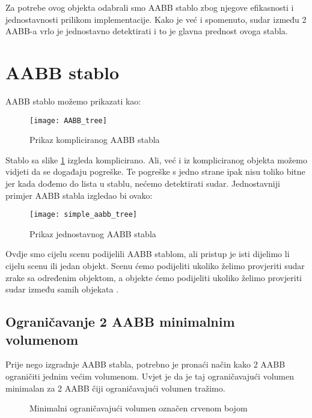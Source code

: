 Za potrebe ovog objekta odabrali smo AABB stablo zbog njegove efikasnosti i jednostavnosti prilikom implementacije. Kako je već i spomenuto, sudar između 2 AABB-a vrlo je jednostavno detektirati i to je glavna prednost ovoga stabla.

\section{AABB stablo}
AABB stablo možemo prikazati kao:
\begin{figure}[!http]
	\begin{center}
		\texttt{[image: AABB\_tree]}
		\caption{Prikaz kompliciranog AABB stabla \cite{5}}
		\label{fig:8}
	\end{center}
\end{figure}
Stablo sa slike \ref{fig:8} izgleda komplicirano. Ali, već i iz kompliciranog objekta možemo vidjeti da se događaju pogreške. Te pogreške s jedno strane ipak nisu toliko bitne jer kada dođemo do lista u stablu, nećemo detektirati sudar. Jednostavniji primjer AABB stabla izgledao bi ovako:
\begin{figure}[!http]
	\begin{center}
		\texttt{[image: simple\_aabb\_tree]}
		\caption{Prikaz jednostavnog AABB stabla}
		\label{fig:9}
	\end{center}
\end{figure}
\newline
Ovdje smo cijelu scenu podijelili AABB stablom, ali pristup je isti dijelimo li cijelu scenu ili jedan objekt. Scenu ćemo podijeliti ukoliko želimo provjeriti sudar zrake sa određenim objektom, a objekte ćemo podijeliti ukoliko želimo provjeriti sudar između samih objekata \cite{1}. 
\subsection{Ograničavanje 2 AABB minimalnim volumenom}\label{subsec:combineAABB}
Prije nego izgradnje AABB stabla, potrebno je pronaći način kako 2 AABB ograničiti jednim većim volumenom. Uvjet je da je taj ograničavajući volumen minimalan za 2 AABB čiji ograničavajući volumen tražimo.

\begin{figure}[!http]
	\begin{center}
		\label{fig:10}
		\caption{Minimalni ograničavajući volumen označen crvenom bojom}
	\end{center}
\end{figure}

